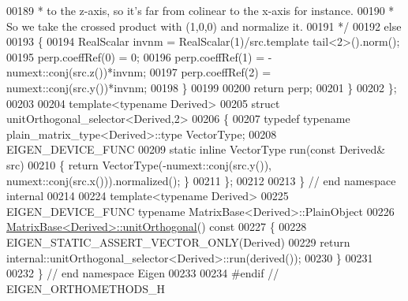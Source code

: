 \begin{DoxyCode}
00189 \textcolor{comment}{     * to the z-axis, so it's far from colinear to the x-axis for instance.}
00190 \textcolor{comment}{     * So we take the crossed product with (1,0,0) and normalize it.}
00191 \textcolor{comment}{     */}
00192     \textcolor{keywordflow}{else}
00193     \{
00194       RealScalar invnm = RealScalar(1)/src.template tail<2>().norm();
00195       perp.coeffRef(0) = 0;
00196       perp.coeffRef(1) = -numext::conj(src.z())*invnm;
00197       perp.coeffRef(2) = numext::conj(src.y())*invnm;
00198     \}
00199 
00200     \textcolor{keywordflow}{return} perp;
00201    \}
00202 \};
00203 
00204 \textcolor{keyword}{template}<\textcolor{keyword}{typename} Derived>
00205 \textcolor{keyword}{struct }unitOrthogonal\_selector<Derived,2>
00206 \{
00207   \textcolor{keyword}{typedef} \textcolor{keyword}{typename} plain\_matrix\_type<Derived>::type VectorType;
00208   EIGEN\_DEVICE\_FUNC
00209   \textcolor{keyword}{static} \textcolor{keyword}{inline} VectorType run(\textcolor{keyword}{const} Derived& src)
00210   \{ \textcolor{keywordflow}{return} VectorType(-numext::conj(src.y()), numext::conj(src.x())).normalized(); \}
00211 \};
00212 
00213 \} \textcolor{comment}{// end namespace internal}
00214 
00224 \textcolor{keyword}{template}<\textcolor{keyword}{typename} Derived>
00225 EIGEN\_DEVICE\_FUNC \textcolor{keyword}{typename} MatrixBase<Derived>::PlainObject
00226 \hyperlink{group___geometry___module_ga2fd7a02d7bc4c339f0e97f12c09acb25}{MatrixBase<Derived>::unitOrthogonal}()\textcolor{keyword}{ const}
00227 \textcolor{keyword}{}\{
00228   EIGEN\_STATIC\_ASSERT\_VECTOR\_ONLY(Derived)
00229   \textcolor{keywordflow}{return} internal::unitOrthogonal\_selector<Derived>::run(derived());
00230 \}
00231 
00232 \} \textcolor{comment}{// end namespace Eigen}
00233 
00234 \textcolor{preprocessor}{#endif // EIGEN\_ORTHOMETHODS\_H}
\end{DoxyCode}
